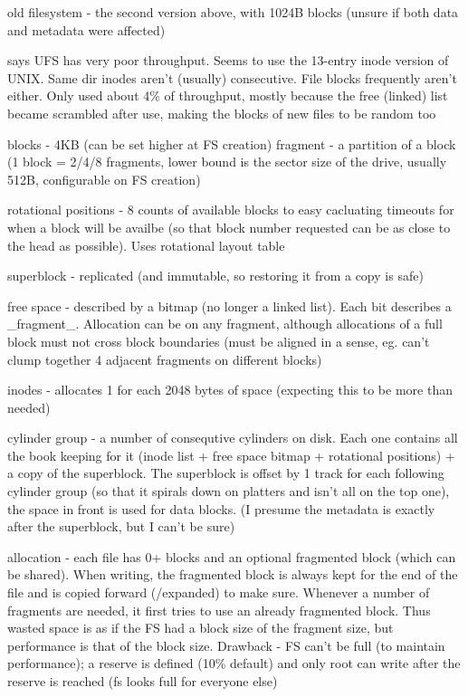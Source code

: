 \documentclass[a4paper]{article}
\begin{document}
        old filesystem - the second version above, with 1024B blocks (unsure if
        both data and metadata were affected)

        says UFS has very poor throughput. Seems to use the 13-entry inode
        version of UNIX. Same dir inodes aren't (usually) consecutive. File
        blocks frequently aren't either. Only used about 4\% of throughput,
        mostly because the free (linked) list became scrambled after use,
        making the blocks of new files to be random too

        blocks - 4KB (can be set higher at FS creation)
        fragment - a partition of a block (1 block = 2/4/8 fragments, lower
        bound is the sector size of the drive, usually 512B, configurable on FS
        creation)

        rotational positions - 8 counts of available blocks to easy cacluating
        timeouts for when a block will be availbe (so that block number
        requested can be as close to the head as possible). Uses rotational
        layout table

        superblock - replicated (and immutable, so restoring it from a copy is safe)

        free space - described by a bitmap (no longer a linked list). Each bit
        describes a \_fragment\_. Allocation can be on any fragment, although
        allocations of a full block must not cross block boundaries (must be
        aligned in a sense, eg. can't clump together 4 adjacent fragments on
        different blocks)

        inodes - allocates 1 for each 2048 bytes of space (expecting this to be
        more than needed)

        cylinder group - a number of consequtive cylinders on disk. Each one
        contains all the book keeping for it (inode list + free space bitmap +
        rotational positions) + a copy of the superblock. The superblock is
        offset by 1 track for each following cylinder group (so that it spirals
        down on platters and isn't all on the top one), the space in front is
        used for data blocks. (I presume the metadata is exactly after the
        superblock, but I can't be sure)

        allocation - each file has 0+ blocks and an optional fragmented block
        (which can be shared). When writing, the fragmented block is always
        kept for the end of the file and is copied forward (/expanded) to make
        sure. Whenever a number of fragments are needed, it first tries to use
        an already fragmented block. Thus wasted space is as if the FS had a
        block size of the fragment size, but performance is that of the block
        size. Drawback - FS can't be full (to maintain performance); a reserve
        is defined (10\% default) and only root can write after the reserve is
        reached (fs looks full for everyone else)
\end{document}
